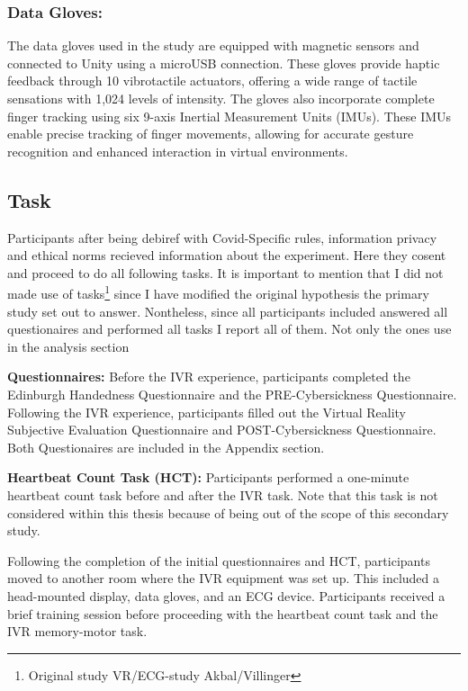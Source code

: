 \documentclass[12pt,oneside,openright]{report}
\begin{document}
\subsubsection*{Data Gloves:}
The data gloves used in the study are equipped with magnetic sensors and connected to Unity using a microUSB connection. These gloves provide haptic feedback through 10 vibrotactile actuators, offering a wide range of tactile sensations with 1,024 levels of intensity. The gloves also incorporate complete finger tracking using six 9-axis Inertial Measurement Units (IMUs). These IMUs enable precise tracking of finger movements, allowing for accurate gesture recognition and enhanced interaction in virtual environments.


\subsection*{Task}

Participants after being debiref with Covid-Specific rules, information privacy and ethical norms recieved information about the experiment. Here they cosent and proceed to do all following tasks. It is important to mention that I did not made use of tasks\footnote{Original study VR/ECG-study Akbal/Villinger} since I have modified the original hypothesis the primary study set out to answer. Nontheless, since all participants included answered all questionaires and performed all tasks I report all of them. Not only the ones use in the analysis section 


\textbf{Questionnaires:} Before the IVR experience, participants completed the Edinburgh Handedness Questionnaire and the PRE-Cybersickness Questionnaire. Following the IVR experience, participants filled out the Virtual Reality Subjective Evaluation Questionnaire and POST-Cybersickness Questionnaire. Both Questionaires are included in the Appendix section.

\textbf{Heartbeat Count Task (HCT):} Participants performed a one-minute heartbeat count task before and after the IVR task. Note that this task is not considered within this thesis because of being out of the scope of this secondary study.

Following the completion of the initial questionnaires and HCT, participants moved to another room where the IVR  equipment was set up. This included a head-mounted display, data gloves, and an ECG device. Participants received a brief training session before proceeding with the heartbeat count task and the IVR memory-motor task.
\end{document}
